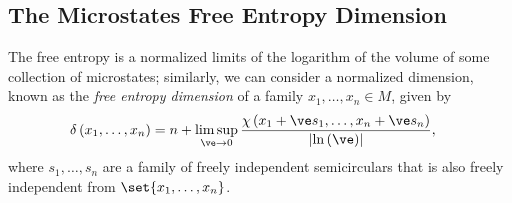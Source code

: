 \documentclass[10pt]{mypackage}
\begin{document}
\subsection{The Microstates Free Entropy Dimension}%
The free entropy is a normalized limits of the logarithm of the volume of some collection of microstates; similarly, we can consider a normalized dimension, known as the \textit{free entropy dimension} of a family $x_1,\dots,x_n\in M$, given by
\begin{align*}
  \delta\left( x_1,\dots,x_n \right) &= n + \limsup_{\ve\rightarrow 0} \frac{\chi\left( x_1 + \ve s_1,\dots,x_n + \ve s_n \right)}{\left\vert \ln \left( \ve \right) \right\vert},
\end{align*}
where $s_1,\dots,s_n$ are a family of freely independent semicirculars that is also freely independent from $\set{x_1,\dots,x_n}$.
\end{document}
